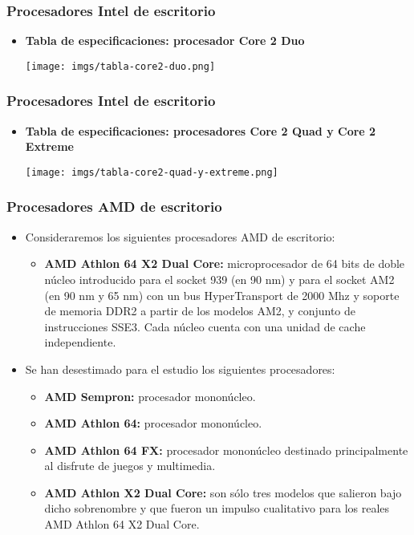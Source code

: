 \frame
{
\frametitle{Procesadores Intel de escritorio}
\begin{itemize}
 \item \textbf{Tabla de especificaciones: procesador \textbf{Core 2 Duo}}
\begin{center}
\texttt{[image: imgs/tabla-core2-duo.png]}
\end{center}
\end{itemize}
}

\frame
{
\frametitle{Procesadores Intel de escritorio}
\begin{itemize}
 \item \textbf{Tabla de especificaciones: procesadores \textbf{Core 2 Quad y Core 2 Extreme}}
\begin{center}
\texttt{[image: imgs/tabla-core2-quad-y-extreme.png]}
\end{center}
\end{itemize}
}


\frame
{
\frametitle{Procesadores AMD de escritorio}
\begin{itemize}
\item Consideraremos los siguientes procesadores AMD de escritorio:
	\begin{itemize}
 	\item \textbf{AMD Athlon 64 X2 Dual Core:} microprocesador de 64 bits de doble núcleo introducido para el socket 939 (en 90 nm) y para el socket AM2 (en 90 nm y 65 nm) con un bus HyperTransport de 2000 Mhz y soporte de memoria DDR2 a partir de los modelos AM2, y conjunto de instrucciones SSE3. Cada núcleo cuenta con una unidad de cache independiente.
	\end{itemize}

\item Se han desestimado para el estudio los siguientes procesadores:
	\begin{itemize}
	 \item \textbf{AMD Sempron:} procesador mononúcleo.
	 \item \textbf{AMD Athlon 64:} procesador mononúcleo.
	 \item \textbf{AMD Athlon 64 FX:} procesador mononúcleo destinado principalmente al disfrute de juegos y multimedia.
	 \item \textbf{AMD Athlon X2 Dual Core:} son sólo tres modelos que salieron bajo dicho sobrenombre y que fueron un impulso cualitativo para los reales AMD Athlon 64 X2 Dual Core.
	\end{itemize}
\end{itemize}
}

